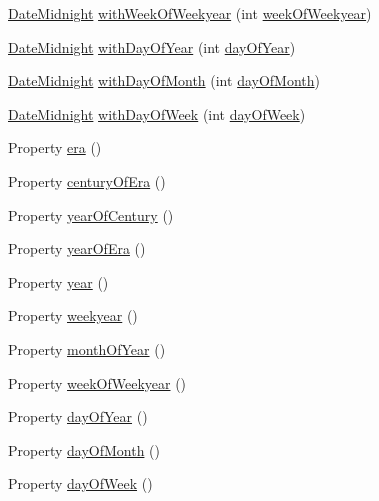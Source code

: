 \begin{DoxyCompactItemize}
\item 
\hyperlink{classorg_1_1joda_1_1time_1_1_date_midnight}{Date\-Midnight} \hyperlink{classorg_1_1joda_1_1time_1_1_date_midnight_ae9aabb649455b9245c4e54eaf0e5ea81}{with\-Week\-Of\-Weekyear} (int \hyperlink{classorg_1_1joda_1_1time_1_1_date_midnight_a9c0cd58252e1a7a42ed0f23de8fbc561}{week\-Of\-Weekyear})
\item 
\hyperlink{classorg_1_1joda_1_1time_1_1_date_midnight}{Date\-Midnight} \hyperlink{classorg_1_1joda_1_1time_1_1_date_midnight_a9797b5e447b0500f2001c7ce39929484}{with\-Day\-Of\-Year} (int \hyperlink{classorg_1_1joda_1_1time_1_1_date_midnight_ac88430a05f53ae5396e499e708446724}{day\-Of\-Year})
\item 
\hyperlink{classorg_1_1joda_1_1time_1_1_date_midnight}{Date\-Midnight} \hyperlink{classorg_1_1joda_1_1time_1_1_date_midnight_abc02a8bf67c54039d2204b0f4d75fca2}{with\-Day\-Of\-Month} (int \hyperlink{classorg_1_1joda_1_1time_1_1_date_midnight_a051a9b4a5d9a944cabc3db73cc9d7417}{day\-Of\-Month})
\item 
\hyperlink{classorg_1_1joda_1_1time_1_1_date_midnight}{Date\-Midnight} \hyperlink{classorg_1_1joda_1_1time_1_1_date_midnight_a54d6bd6a0886fd05ee4589a2615c9873}{with\-Day\-Of\-Week} (int \hyperlink{classorg_1_1joda_1_1time_1_1_date_midnight_a33389510975a4b411dd4989d0f241657}{day\-Of\-Week})
\item 
Property \hyperlink{classorg_1_1joda_1_1time_1_1_date_midnight_a1b4e26dd69af8252e1d2f3ffd6a79b31}{era} ()
\item 
Property \hyperlink{classorg_1_1joda_1_1time_1_1_date_midnight_a124b8e263c38066dfd9560e1ef0f26cf}{century\-Of\-Era} ()
\item 
Property \hyperlink{classorg_1_1joda_1_1time_1_1_date_midnight_a89297337b05c4c802497ef3d301d2892}{year\-Of\-Century} ()
\item 
Property \hyperlink{classorg_1_1joda_1_1time_1_1_date_midnight_a34bc8b79b63f0a23a2715c3b91c4f97c}{year\-Of\-Era} ()
\item 
Property \hyperlink{classorg_1_1joda_1_1time_1_1_date_midnight_a01ec5ea504f50bf6338bfa8f40700bae}{year} ()
\item 
Property \hyperlink{classorg_1_1joda_1_1time_1_1_date_midnight_a1f0028ab56db9f6854998d0bfdad55c9}{weekyear} ()
\item 
Property \hyperlink{classorg_1_1joda_1_1time_1_1_date_midnight_a80f137963f1fbf273ac328d831eff685}{month\-Of\-Year} ()
\item 
Property \hyperlink{classorg_1_1joda_1_1time_1_1_date_midnight_a9c0cd58252e1a7a42ed0f23de8fbc561}{week\-Of\-Weekyear} ()
\item 
Property \hyperlink{classorg_1_1joda_1_1time_1_1_date_midnight_ac88430a05f53ae5396e499e708446724}{day\-Of\-Year} ()
\item 
Property \hyperlink{classorg_1_1joda_1_1time_1_1_date_midnight_a051a9b4a5d9a944cabc3db73cc9d7417}{day\-Of\-Month} ()
\item 
Property \hyperlink{classorg_1_1joda_1_1time_1_1_date_midnight_a33389510975a4b411dd4989d0f241657}{day\-Of\-Week} ()
\end{DoxyCompactItemize}
